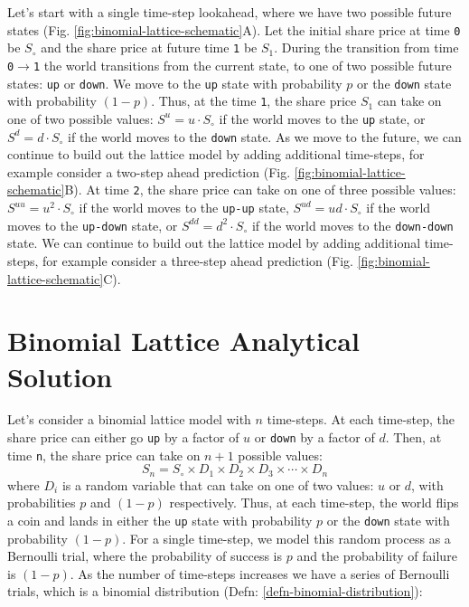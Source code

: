 \documentclass[11pt]{article}
\theoremstyle{definition}
\begin{document}
Let's start with a single time-step lookahead, where we have two possible future states (Fig. \ref{fig:binomial-lattice-schematic}A).
Let the initial share price at time \texttt{0} be $S_{\circ}$ and the share price at future time \texttt{1} be $S_{1}$.
During the transition from time \texttt{0}$\rightarrow$\texttt{1} the world transitions from the current state, to one of two possible future states: \texttt{up} or \texttt{down}.
We move to the \texttt{up} state with probability $p$ or the \texttt{down} state with probability $(1-p)$.
Thus, at the time \texttt{1}, the share price $S_{1}$ can take on one of two possible values: $S^{u} = u\cdot{S_{\circ}}$ if the world moves 
to the \texttt{up} state, or $S^{d} = d\cdot{S_{\circ}}$ if the world moves to the \texttt{down} state. 
As we move to the future, we can continue to build out the lattice model by adding additional time-steps, 
for example consider a two-step ahead prediction (Fig. \ref{fig:binomial-lattice-schematic}B). 
At time \texttt{2}, the share price can take on one of three possible values: $S^{uu} = u^{2}\cdot{S_{\circ}}$ if the world moves
to the \texttt{up-up} state, $S^{ud} = ud\cdot{S_{\circ}}$ if the world moves to the \texttt{up-down} state, or $S^{dd} = d^{2}\cdot{S_{\circ}}$ if the world moves to the \texttt{down-down} state.
We can continue to build out the lattice model by adding additional time-steps, for example consider a three-step ahead prediction (Fig. \ref{fig:binomial-lattice-schematic}C).

\section*{Binomial Lattice Analytical Solution}
Let's consider a binomial lattice model with $n$ time-steps. At each time-step, the share price can either go \texttt{up} by a factor of $u$ or \texttt{down} by a factor of $d$.
Then, at time \texttt{n}, the share price can take on $n+1$ possible values: 
\begin{equation}
	S_{n} = S_{\circ}\times{D_{1}}\times{D_{2}}\times{D_{3}}\times\cdots\times{D_{n}}
\end{equation}
where $D_{i}$ is a random variable that can take on one of two values: $u$ or $d$, 
with probabilities $p$ and $(1-p)$ respectively. 
Thus, at each time-step, the world flips a coin and lands in either the \texttt{up} state with probability $p$ or the \texttt{down} state with probability $(1-p)$.
For a single time-step, we model this random process as a Bernoulli trial, where the probability of success is $p$ and the probability of failure is $(1-p)$.
As the number of time-steps increases we have a series of Bernoulli trials, which is a binomial distribution (Defn: \ref{defn-binomial-distribution}):
\end{document}
